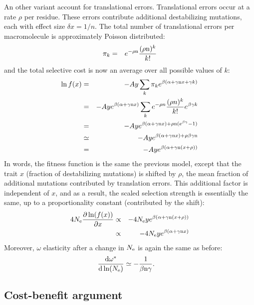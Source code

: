 \documentclass{article}
\begin{document}
An other variant account for translational errors. Translational errors occur at a rate $\rho$ per residue. These errors contribute additional destabilizing mutations, each with effect size $\delta x = 1/n$. The total number of translational errors per macromolecule is approximately Poisson distributed:
\begin{eqnarray}
\pi_k &=& e^{-\rho \text{n}} \frac{(\rho \text{n})^k}{k!}
\end{eqnarray}
and the total selective cost is now an average over all possible values of $k$:
\begin{eqnarray}
\ln f(x) &=& - A y \sum_k \pi_k e^{\beta(\alpha + \gamma\text{n} x + \gamma k)}
\\
&=& - A y  e^{\beta(\alpha + \gamma\text{n} x)} \sum_k e^{-\rho n} \frac{(\rho n)^k}{k!} e^{\beta \gamma k}
\\
&=& - A y  e^{\beta(\alpha + \gamma\text{n} x) + \rho \text{n} (e^{\beta \gamma} -1 )}
\\
& \simeq & - A y  e^{\beta(\alpha + \gamma\text{n} x) + \rho \beta \gamma \text{n}}
\\
& =& - A y  e^{\beta(\alpha + \gamma \text{n} (x + \rho))}
\end{eqnarray}
In words, the fitness function is the same the previous model, except that the trait $x$ (fraction of destabilizing mutations) is shifted by $\rho$, the mean fraction of additional mutations contributed by translation errors. This additional factor is independent of $x$, and as a result, the scaled selection strength is essentially the same, up to a proportionality constant (contributed by the shift):
\begin{eqnarray}
4 N_{\mathrm{e}} \frac{\partial \ln (f(x))}{\partial x} &\propto& -4 N_{\mathrm{e}} y e^{\beta(\alpha + \gamma \text{n} (x + \rho))}
\\ &\propto& -4 N_{\mathrm{e}} y e^{\beta(\alpha + \gamma\text{n} x)}
\end{eqnarray}
Moreover, $\omega$ elasticity after a change in $N_{\mathrm{e}}$ is again the same as before:
\begin{align}
\frac{ \mathrm{d} \omega^{*}}{\mathrm{d} \ln (N_{\mathrm{e}})} & \simeq - \frac{1}{\beta \text{n} \gamma}.
\end{align}

\subsection{Cost-benefit argument}
\end{document}
